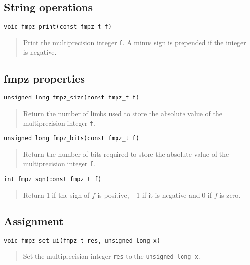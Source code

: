 \documentclass[a4paper,10pt]{article}
\newcommand{\code}{\lstinline}
\begin{document}
\subsection{String operations}

\begin{lstlisting}
void fmpz_print(const fmpz_t f)
\end{lstlisting}
\begin{quote}
Print the multiprecision integer \code{f}. A minus sign is prepended if the integer is negative.
\end{quote}

\subsection{fmpz properties}

\begin{lstlisting}
unsigned long fmpz_size(const fmpz_t f)
\end{lstlisting}
\begin{quote}
Return the number of limbs used to store the absolute value of the multiprecision integer \code{f}.
\end{quote}

\begin{lstlisting}
unsigned long fmpz_bits(const fmpz_t f)
\end{lstlisting}
\begin{quote}
Return the number of bits required to store the absolute value of the multiprecision integer \code{f}.
\end{quote}

\begin{lstlisting}
int fmpz_sgn(const fmpz_t f)
\end{lstlisting}
\begin{quote}
Return $1$ if the sign of $f$ is positive, $-1$ if it is negative and $0$ if $f$ is zero. 
\end{quote}

\subsection{Assignment}

\begin{lstlisting}
void fmpz_set_ui(fmpz_t res, unsigned long x)
\end{lstlisting}
\begin{quote}
Set the multiprecision integer \code{res} to the \code{unsigned long x}.
\end{quote}
\end{document}
